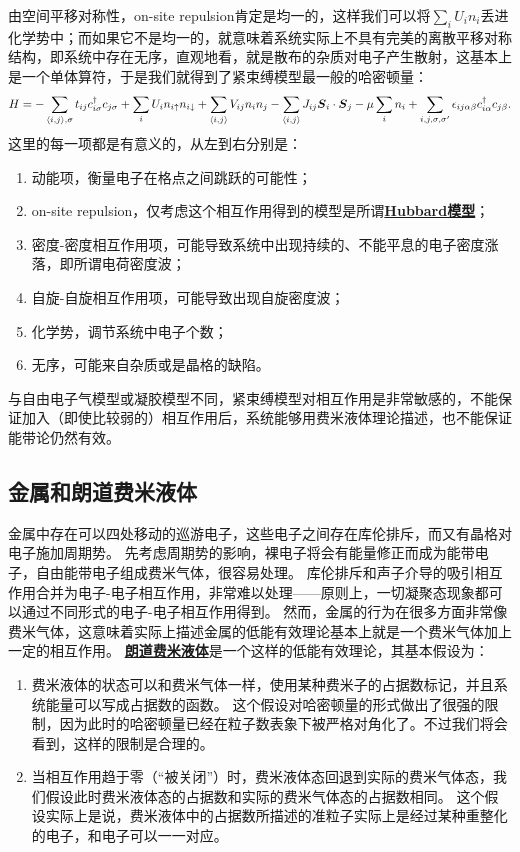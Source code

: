 \documentclass[hyperref, UTF8, a4paper]{ctexart}
\newcommand*{\pair}[1]{\langle #1 \rangle}
\newcommand*{\concept}[1]{\underline{\textbf{#1}}}
\begin{document}
由空间平移对称性，on-site repulsion肯定是均一的，这样我们可以将$\sum_i U_i n_i$丢进化学势中；而如果它不是均一的，就意味着系统实际上不具有完美的离散平移对称结构，即系统中存在无序，直观地看，就是散布的杂质对电子产生散射，这基本上是一个单体算符，于是我们就得到了紧束缚模型最一般的哈密顿量：
\begin{equation}
    H = - \sum_{\pair{i, j}, \sigma} t_{ij} c^\dagger_{i \sigma} c_{j \sigma} 
    + \sum_{i} U_i n_{i \uparrow} n_{i \downarrow} 
    + \sum_{\pair{i, j}} V_{ij} n_i n_j - \sum_{\pair{i, j}} J_{i j} \vb*{S}_{i} \cdot \vb*{S}_j 
    - \mu \sum_i n_i + \sum_{i, j, \sigma, \sigma'} \epsilon_{ij\alpha \beta} c^\dagger_{i \alpha} c_{j \beta}.  
\end{equation}
这里的每一项都是有意义的，从左到右分别是：
\begin{enumerate}
    \item 动能项，衡量电子在格点之间跳跃的可能性；
    \item on-site repulsion，仅考虑这个相互作用得到的模型是所谓\concept{Hubbard模型}；
    \item 密度-密度相互作用项，可能导致系统中出现持续的、不能平息的电子密度涨落，即所谓电荷密度波；
    \item 自旋-自旋相互作用项，可能导致出现自旋密度波；
    \item 化学势，调节系统中电子个数；
    \item 无序，可能来自杂质或是晶格的缺陷。
\end{enumerate}

与自由电子气模型或凝胶模型不同，紧束缚模型对相互作用是非常敏感的，不能保证加入（即使比较弱的）相互作用后，系统能够用费米液体理论描述，也不能保证能带论仍然有效。

\subsection{金属和朗道费米液体}

金属中存在可以四处移动的巡游电子，这些电子之间存在库伦排斥，而又有晶格对电子施加周期势。
先考虑周期势的影响，裸电子将会有能量修正而成为能带电子，自由能带电子组成费米气体，很容易处理。
库伦排斥和声子介导的吸引相互作用合并为电子-电子相互作用，非常难以处理——原则上，一切凝聚态现象都可以通过不同形式的电子-电子相互作用得到。
然而，金属的行为在很多方面非常像费米气体，这意味着实际上描述金属的低能有效理论基本上就是一个费米气体加上一定的相互作用。
\concept{朗道费米液体}是一个这样的低能有效理论，其基本假设为：
\begin{enumerate}
    \item 费米液体的状态可以和费米气体一样，使用某种费米子的占据数标记，并且系统能量可以写成占据数的函数。
    这个假设对哈密顿量的形式做出了很强的限制，因为此时的哈密顿量已经在粒子数表象下被严格对角化了。不过我们将会看到，这样的限制是合理的。
    \item 当相互作用趋于零（“被关闭”）时，费米液体态回退到实际的费米气体态，我们假设此时费米液体态的占据数和实际的费米气体态的占据数相同。
    这个假设实际上是说，费米液体中的占据数所描述的准粒子实际上是经过某种重整化的电子，和电子可以一一对应。
\end{enumerate}
\end{document}
